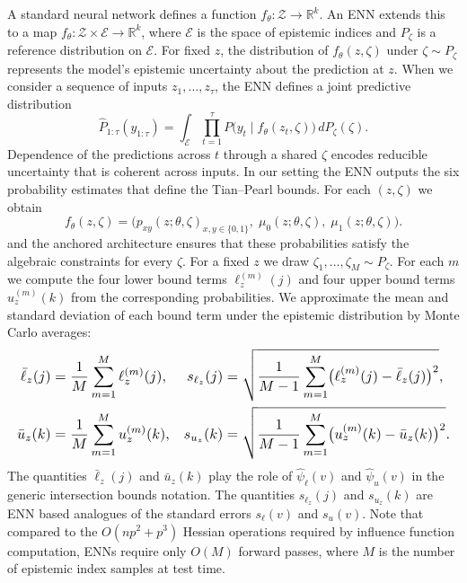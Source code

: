 \documentclass[accepted]{uai2026} %
\theoremstyle{plain}
\theoremstyle{definition}
\theoremstyle{remark}
\begin{document}
A standard neural network defines a function
$f_\theta \colon \mathcal{Z} \to \mathbb{R}^k$.
An ENN extends this to a map
$f_\theta \colon \mathcal{Z} \times \mathcal{E} \to \mathbb{R}^k$, where
$\mathcal{E}$ is the space of epistemic indices and $P_\zeta$ is a reference
distribution on $\mathcal{E}$.
For fixed $z$, the distribution of $f_\theta(z,\zeta)$ under
$\zeta \sim P_\zeta$ represents the model's epistemic uncertainty about the
prediction at $z$.
When we consider a sequence of inputs $z_1,\ldots,z_\tau$, the ENN defines a
joint predictive distribution
\begin{equation}
\hat{P}_{1:\tau}(y_{1:\tau})
  = \int_{\mathcal{E}}
      \prod_{t=1}^\tau P\bigl(y_t \mid f_\theta(z_t,\zeta)\bigr)
    \, dP_\zeta(\zeta).
\end{equation}
Dependence of the predictions across $t$ through a shared $\zeta$ encodes
reducible uncertainty that is coherent across inputs.
In our setting the ENN outputs the six probability estimates that define the
Tian--Pearl bounds.
For each $(z,\zeta)$ we obtain
\[
f_\theta(z,\zeta)
=
\bigl(
p_{xy}(z;\theta,\zeta)_{x,y\in\{0,1\}},
\;
\mu_0(z;\theta,\zeta),
\;
\mu_1(z;\theta,\zeta)
\bigr).
\]
and the anchored architecture ensures that these probabilities satisfy the
algebraic constraints for every $\zeta$.
For a fixed $z$ we draw $\zeta_1,\ldots,\zeta_M \sim P_\zeta$.
For each $m$ we compute the four lower bound terms $\ell_z^{(m)}(j)$ and four
upper bound terms $u_z^{(m)}(k)$ from the corresponding probabilities.
We approximate the mean and standard deviation of each bound term under the
epistemic distribution by Monte Carlo averages:
\begin{equation}
\resizebox{\columnwidth}{!}{%
$\begin{aligned}
\bar{\ell}_z(j)
  &= \frac{1}{M}
     \sum_{m=1}^M \ell_z^{(m)}(j),
&
s_{\ell_z}(j)
  &= \sqrt{
        \frac{1}{M-1}
        \sum_{m=1}^M
          \bigl(\ell_z^{(m)}(j) - \bar{\ell}_z(j)\bigr)^2
      },
\\
\bar{u}_z(k)
  &= \frac{1}{M}
     \sum_{m=1}^M u_z^{(m)}(k),
&
s_{u_z}(k)
  &= \sqrt{
        \frac{1}{M-1}
        \sum_{m=1}^M
          \bigl(u_z^{(m)}(k) - \bar{u}_z(k)\bigr)^2
      }.
\end{aligned}$%
}
\end{equation}
The quantities $\bar{\ell}_z(j)$ and $\bar{u}_z(k)$ play the role of
$\hat{\psi}_\ell(v)$ and $\hat{\psi}_u(v)$ in the generic intersection
bounds notation.
The quantities $s_{\ell_z}(j)$ and $s_{u_z}(k)$ are ENN based analogues of
the standard errors $s_\ell(v)$ and $s_u(v)$. Note that compared to the $O(np^2 + p^3)$ Hessian operations required by influence function computation, ENNs require only $O(M)$ forward passes, where $M$ is the number of epistemic index samples at test time.
\end{document}
